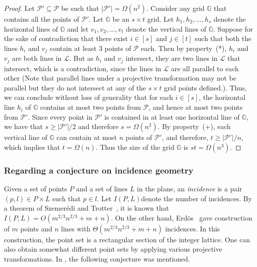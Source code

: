 \documentclass[
final
]{dmtcs-episciences}
\numberwithin{equation}{subsection}
\begin{document}
\begin{proof}
	Let $\mathcal{P}'\subseteq\mathcal{P}$ be such that $|\mathcal{P}'|=\Omega(n^2)$. Consider any grid $\mathbb{G}$ that contains all the points of $\mathcal{P}'$. Let $\mathbb{G}$ be an $s\times t$ grid. Let $h_1,h_2,\ldots,h_s$ denote the horizontal lines of $\mathbb{G}$ and let $v_1,v_2,\ldots,v_t$ denote the vertical lines of $\mathbb{G}$. Suppose for the sake of contradiction that there exist $i\in [s]$ and $j\in [t]$ such that both the lines $h_i$ and $v_j$ contain at least 3 points of $\mathcal{P}$ each. Then by property~(*), $h_i$ and $v_j$ are both lines in $\mathcal{L}$. But as $h_i$ and $v_j$ intersect, they are two lines in $\mathcal{L}$ that intersect, which is a contradiction, since the lines in $\mathcal{L}$ are all parallel to each other (Note that parallel lines under a projective transformation may not be parallel but they do not intersect at any of the $s\times t$ grid points defined.). Thus, we can conclude without loss of generality that for each $i\in [s]$, the horizontal line $h_i$ of $\mathbb{G}$ contains at most two points from $\mathcal{P}$, and hence at most two points from $\mathcal{P}'$. Since every point in $\mathcal{P}'$ is contained in at least one horizontal line of $\mathbb{G}$, we have that $s\geq |\mathcal{P}'|/2$ and therefore $s=\Omega(n^2)$. By property~(+), each vertical line of $\mathbb{G}$ can contain at most $n$ points of $\mathcal{P}'$, and therefore, $t\geq |\mathcal{P}'|/n$, which implies that $t=\Omega(n)$. Thus the size of the grid $\mathbb{G}$ is $st=\Omega(n^3)$.
\end{proof}

\subsubsection*{Regarding a conjecture on incidence geometry}

Given a set of points $P$ and a set of lines $L$ in the plane, an {\it incidence} is a pair $(p,l)\in P\times L$ such that $p\in l$. Let $I(P,L)$denote the number of incidences. By a theorem of Szemer\'{e}di and Trotter~\cite{szemeredi1983}, it  is known that $I(P,L)=O(m^{2/3}n^{2/3}+m+n)$. On the other hand, Erd\"{o}s~\cite{erdos1985} gave construction of $m$ points and $n$ lines with $\Theta (m^{2/3}n^{2/3}+m+n)$ incidences. In this construction, the point set is a rectangular section of the integer lattice. One can also obtain somewhat different point sets by applying various projective transformations. In \cite{sheffer_2022}, the following conjecture was mentioned.
\end{document}
